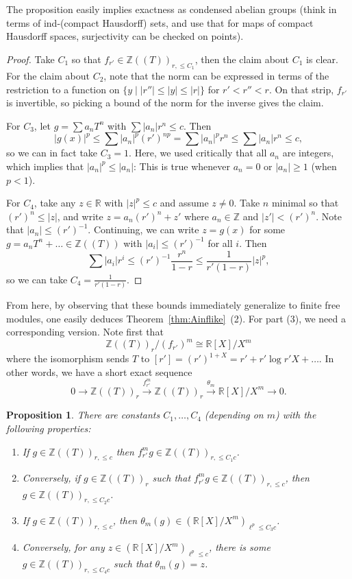 \documentclass[11pt]{amsbook}
\numberwithin{equation}{section}
\numberwithin{theorem}{section}
\newtheorem{proposition}[theorem]{Proposition}
\theoremstyle{definition}
\begin{document}
The proposition easily implies exactness as condensed abelian groups (think in terms of ind-(compact Hausdorff) sets, and use that for maps of compact Hausdorff spaces, surjectivity can be checked on points).

\begin{proof} Take $C_1$ so that $f_{r'}\in \mathbb Z((T))_{r,\leq C_1}$, then the claim about $C_1$ is clear. For the claim about $C_2$, note that the norm can be expressed in terms of the restriction to a function on $\{y\mid |r''|\leq |y|\leq |r|\}$ for $r'<r''<r$. On that strip, $f_{r'}$ is invertible, so picking a bound of the norm for the inverse gives the claim.

For $C_3$, let $g=\sum a_nT^n$ with $\sum |a_n|r^n\leq c$. Then
\[
|g(x)|^p\leq \sum |a_n|^p (r')^{np} = \sum |a_n|^p r^n\leq \sum |a_n|r^n\leq c,
\]
so we can in fact take $C_3=1$. Here, we used critically that all $a_n$ are integers, which implies that $|a_n|^p\leq |a_n|$: This is true whenever $a_n=0$ or $|a_n|\geq 1$ (when $p<1$).

For $C_4$, take any $z\in \mathbb R$ with $|z|^p\leq c$ and assume $z\neq 0$. Take $n$ minimal so that $(r')^n\leq |z|$, and write $z=a_n(r')^n + z'$ where $a_n\in \mathbb Z$ and $|z'|<(r')^n$. Note that $|a_n|\leq (r')^{-1}$. Continuing, we can write $z=g(x)$ for some $g=a_nT^n+\ldots\in \mathbb Z((T))$ with $|a_i|\leq (r')^{-1}$ for all $i$. Then
\[
\sum |a_i|r^i\leq (r')^{-1} \frac{r^n}{1-r}\leq \frac{1}{r'(1-r)} |z|^p,
\]
so we can take $C_4=\frac{1}{r'(1-r)}$.
\end{proof}

From here, by observing that these bounds immediately generalize to finite free modules, one easily deduces Theorem~\ref{thm:Ainflike}~(2). For part (3), we need a corresponding version. Note first that
\[
\mathbb Z((T))_r/(f_{r'})^m\cong \mathbb R[X]/X^m
\]
where the isomorphism sends $T$ to $[r']=(r')^{1+X}=r'+r'\log r' X + \ldots$. In other words, we have a short exact sequence
\[
0\to \mathbb Z((T))_r\xrightarrow{f_{r'}^m} \mathbb Z((T))_r\xrightarrow{\theta_m} \mathbb R[X]/X^m\to 0.
\]

\begin{proposition} There are constants $C_1,\ldots,C_4$ (depending on $m$) with the following properties:
\begin{enumerate}
\item If $g\in \mathbb Z((T))_{r,\leq c}$ then $f_{r'}^mg\in \mathbb Z((T))_{r,\leq C_1c}$.
\item Conversely, if $g\in \mathbb Z((T))_r$ such that $f_{r'}^mg\in \mathbb Z((T))_{r,\leq c}$, then $g\in \mathbb Z((T))_{r,\leq C_2c}$.
\item If $g\in \mathbb Z((T))_{r,\leq c}$, then $\theta_m(g)\in (\mathbb R[X]/X^m)_{\ell^p\leq C_3c}$.
\item Conversely, for any $z\in (\mathbb R[X]/X^m)_{\ell^p\leq c}$, there is some $g\in \mathbb Z((T))_{r,\leq C_4c}$ such that $\theta_m(g)=z$.
\end{enumerate}
\end{proposition}
\end{document}
